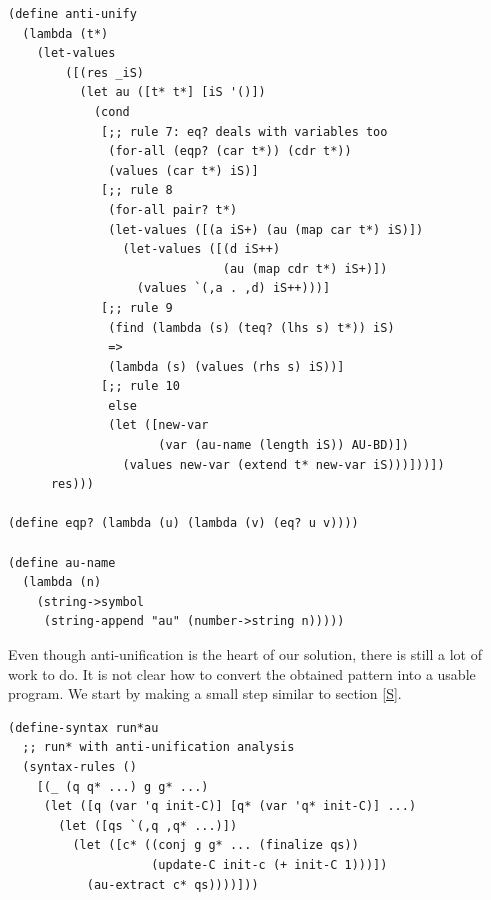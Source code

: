 \begin{lstlisting}
(define anti-unify
  (lambda (t*)
    (let-values
        ([(res _iS)
          (let au ([t* t*] [iS '()])
            (cond
             [;; rule 7: eq? deals with variables too
              (for-all (eqp? (car t*)) (cdr t*))
              (values (car t*) iS)]
             [;; rule 8
              (for-all pair? t*)
              (let-values ([(a iS+) (au (map car t*) iS)])
                (let-values ([(d iS++)
                              (au (map cdr t*) iS+)])
                  (values `(,a . ,d) iS++)))]
             [;; rule 9
              (find (lambda (s) (teq? (lhs s) t*)) iS)
              =>
              (lambda (s) (values (rhs s) iS))]
             [;; rule 10
              else
              (let ([new-var
                     (var (au-name (length iS)) AU-BD)])
                (values new-var (extend t* new-var iS)))]))])
      res)))

(define eqp? (lambda (u) (lambda (v) (eq? u v))))

(define au-name
  (lambda (n)
    (string->symbol
     (string-append "au" (number->string n)))))
\end{lstlisting}

Even though anti-unification is the heart of our solution, there is still a lot of work to do. It is not clear how to convert the obtained pattern into a usable program. We start by making a small step similar to section \ref{S}.
\begin{lstlisting}
(define-syntax run*au
  ;; run* with anti-unification analysis
  (syntax-rules ()
    [(_ (q q* ...) g g* ...)
     (let ([q (var 'q init-C)] [q* (var 'q* init-C)] ...)
       (let ([qs `(,q ,q* ...)])
         (let ([c* ((conj g g* ... (finalize qs))
                    (update-C init-c (+ init-C 1)))])
           (au-extract c* qs))))]))
\end{lstlisting}

